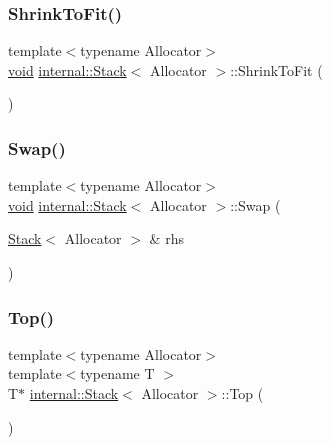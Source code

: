 \subsubsection{\texorpdfstring{Shrink\+To\+Fit()}{ShrinkToFit()}}
{\footnotesize\ttfamily template$<$typename Allocator$>$ \\
\hyperlink{imgui__impl__opengl3__loader_8h_ac668e7cffd9e2e9cfee428b9b2f34fa7}{void} \hyperlink{classinternal_1_1Stack}{internal\+::\+Stack}$<$ Allocator $>$\+::Shrink\+To\+Fit (\begin{DoxyParamCaption}{ }\end{DoxyParamCaption})\hspace{0.3cm}{\ttfamily [inline]}}

\mbox{\label{classinternal_1_1Stack_a5e601199a21d84b1ac612f558be0f2c3}} 
\subsubsection{\texorpdfstring{Swap()}{Swap()}}
{\footnotesize\ttfamily template$<$typename Allocator$>$ \\
\hyperlink{imgui__impl__opengl3__loader_8h_ac668e7cffd9e2e9cfee428b9b2f34fa7}{void} \hyperlink{classinternal_1_1Stack}{internal\+::\+Stack}$<$ Allocator $>$\+::Swap (\begin{DoxyParamCaption}\item[{\hyperlink{classinternal_1_1Stack}{Stack}$<$ Allocator $>$ \&}]{rhs }\end{DoxyParamCaption})\hspace{0.3cm}{\ttfamily [inline]}}

\mbox{\label{classinternal_1_1Stack_ab3ed5b4afed3c73c516678516d5e195b}} 
\subsubsection{\texorpdfstring{Top()}{Top()}\hspace{0.1cm}{\footnotesize\ttfamily [1/2]}}
{\footnotesize\ttfamily template$<$typename Allocator$>$ \\
template$<$typename T $>$ \\
T$\ast$ \hyperlink{classinternal_1_1Stack}{internal\+::\+Stack}$<$ Allocator $>$\+::Top (\begin{DoxyParamCaption}{ }\end{DoxyParamCaption})\hspace{0.3cm}{\ttfamily [inline]}}


